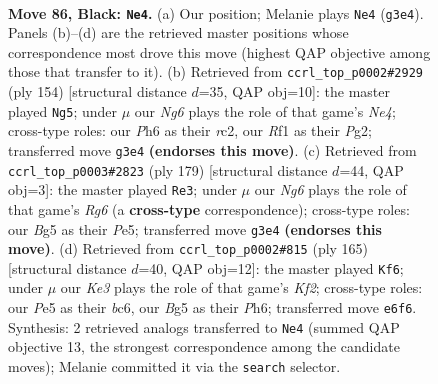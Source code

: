 \documentclass[11pt]{article}
\begin{document}
\clearpage

\begin{figure}[p]\centering
\begin{subfigure}{0.46\textwidth}\centering
\resizebox{\linewidth}{!}{%
\newchessgame
\chessboard[
  setfen={8/8/4k2p/3pp1b1/K6p/6n1/1R3B2/5r2 b - - 7 86},
  showmover=false,
  pgfstyle=straightmove, color=movearrow, markmove={g3-e4}
]}
\caption{}
\end{subfigure}\hfill
\begin{subfigure}{0.46\textwidth}\centering
\resizebox{\linewidth}{!}{%
\newchessgame
\chessboard[
  setfen={3B4/7p/1Pb3k1/8/4N2P/5PK1/2r3P1/8 w - - 61 78},
  showmover=false,
  pgfstyle=straightmove, color=movearrow, markmove={e4-g5}
]}
\caption{}
\end{subfigure}
\\[4pt]
\begin{subfigure}{0.46\textwidth}\centering
\resizebox{\linewidth}{!}{%
\newchessgame
\chessboard[
  setfen={3R4/8/3Bpk2/1p2p3/4Pp1K/6r1/8/8 b - - 8 90},
  showmover=false,
  pgfstyle=straightmove, color=movearrow, markmove={g3-e3}
]}
\caption{}
\end{subfigure}\hfill
\begin{subfigure}{0.46\textwidth}\centering
\resizebox{\linewidth}{!}{%
\newchessgame
\chessboard[
  setfen={8/5kp1/2B4p/2R5/p7/P1nr3P/7K/8 b - - 16 83},
  showmover=false,
  pgfstyle=straightmove, color=movearrow, markmove={f7-f6}
]}
\caption{}
\end{subfigure}
\caption{\textbf{Move 86, Black: \texttt{Ne4}.} (a) Our position; Melanie plays \texttt{Ne4} (\texttt{g3e4}). Panels (b)--(d) are the retrieved master positions whose correspondence most drove this move (highest QAP objective among those that transfer to it). (b) Retrieved from \texttt{ccrl\_top\_p0002\#2929} (ply 154) [structural distance $d$=35, QAP obj=10]: the master played \texttt{Ng5}; under $\mu$ our \emph{Ng6} plays the role of that game's \emph{Ne4}; cross-type roles: our \emph{P}h6 as their \emph{r}c2, our \emph{R}f1 as their \emph{P}g2; transferred move \texttt{g3e4} \textbf{(endorses this move)}. (c) Retrieved from \texttt{ccrl\_top\_p0003\#2823} (ply 179) [structural distance $d$=44, QAP obj=3]: the master played \texttt{Re3}; under $\mu$ our \emph{Ng6} plays the role of that game's \emph{Rg6} (a \textbf{cross-type} correspondence); cross-type roles: our \emph{B}g5 as their \emph{P}e5; transferred move \texttt{g3e4} \textbf{(endorses this move)}. (d) Retrieved from \texttt{ccrl\_top\_p0002\#815} (ply 165) [structural distance $d$=40, QAP obj=12]: the master played \texttt{Kf6}; under $\mu$ our \emph{Ke3} plays the role of that game's \emph{Kf2}; cross-type roles: our \emph{P}e5 as their \emph{b}c6, our \emph{B}g5 as their \emph{P}h6; transferred move \texttt{e6f6}. Synthesis: 2 retrieved analogs transferred to \texttt{Ne4} (summed QAP objective 13, the strongest correspondence among the candidate moves); Melanie committed it via the \texttt{search} selector.}
\label{fig:thought-m171}
\end{figure}
\end{document}
